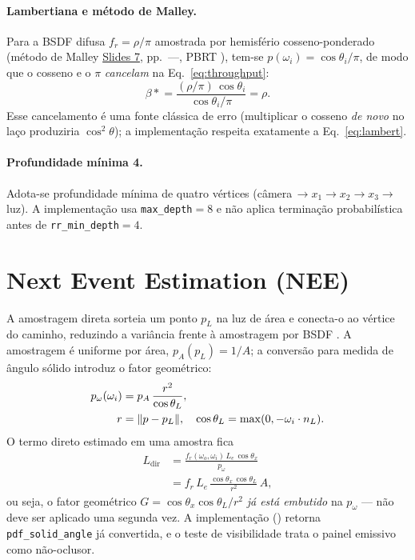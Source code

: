 \documentclass[portuguese]{sbcreviews-2025}%
\makeatletter
\newcommand{\slideurl}[1]{%
    \ifcsname slideurl@#1\endcsname
        \csname slideurl@#1\endcsname
    \else
        #1
    \fi
}
\newcommand{\slidesref}[3]{\href{\slideurl{#1}}{Slides #2}, pp.~#3}
\newcommand{\pbrtcontentsurl}{https://pbr-book.org/4ed/contents.html}
\newcommand{\pbrtsectionurl}[1]{%
    \ifcsname pbrturl@#1\endcsname
        \csname pbrturl@#1\endcsname
    \else
        \pbrtcontentsurl
    \fi
}
\newcommand{\pbrtsec}[1]{\citep[\href{\pbrtsectionurl{#1}}{Se\c{c}\~ao~#1}]{pharr2023pbrt}}
\newcommand{\pbrtsecpair}[2]{\citep[\href{\pbrtsectionurl{#1}}{Se\c{c}\~ao~#1} e \href{\pbrtsectionurl{#2}}{Se\c{c}\~ao~#2}]{pharr2023pbrt}}
\makeatother
\begin{document}
\paragraph{Lambertiana e método de Malley.} Para a BSDF difusa $f_r=\rho/\pi$
\pbrtsec{9.2} amostrada por hemisfério cosseno-ponderado (método de Malley
\slidesref{inf2608slides07}{7}{—}, PBRT \pbrtsec{A.5}), tem-se $p(\omega_i)=\cos\theta_i/\pi$,
de modo que o cosseno e o $\pi$ \emph{cancelam} na Eq.~\eqref{eq:throughput}:
\begin{equation}
\beta \mathrel{\ast}= \frac{(\rho/\pi)\,\cos\theta_i}{\cos\theta_i/\pi} = \rho .
\label{eq:lambert}
\end{equation}
Esse cancelamento é uma fonte clássica de erro (multiplicar o cosseno \emph{de novo} no laço
produziria $\cos^2\theta$); a implementação respeita exatamente a Eq.~\eqref{eq:lambert}.

\paragraph{Profundidade mínima 4.} Adota-se profundidade mínima de quatro vértices
(câmera\,$\to x_1\to x_2\to x_3\to$\,luz). A implementação usa \texttt{max\_depth}$=8$ e não
aplica terminação probabilística antes de \texttt{rr\_min\_depth}$=4$.

\section{Next Event Estimation (NEE)}
\label{sec:nee}

A amostragem direta sorteia um ponto $p_L$ na luz de área e conecta-o ao vértice do caminho,
reduzindo a variância frente à amostragem por BSDF \pbrtsecpair{12.4}{13.4}. A amostragem é
uniforme por área, $p_A(p_L)=1/A$; a conversão para medida de ângulo sólido introduz o fator
geométrico:
\begin{align}
p_\omega(\omega_i) &= p_A\,\frac{r^2}{\cos\theta_L}, \label{eq:areatosolid}\\
r &= \lVert p-p_L \rVert, \quad \cos\theta_L = \max(0, -\omega_i \cdot n_L). \notag
\end{align}
O termo direto estimado em uma amostra fica
\begin{align*}
L_{\mathrm{dir}} &= \frac{f_r(\omega_o,\omega_i)\,L_e\,\cos\theta_x}{p_\omega} \\
                &= f_r\,L_e\,\frac{\cos\theta_x\,\cos\theta_L}{r^2}\,A ,
\end{align*}
ou seja, o fator geométrico $G=\cos\theta_x\cos\theta_L/r^2$ \emph{já está embutido} na
$p_\omega$ — não deve ser aplicado uma segunda vez. A implementação
() retorna \texttt{pdf\_solid\_angle} já convertida,
e o teste de visibilidade trata o painel emissivo como não-oclusor.
\end{document}
